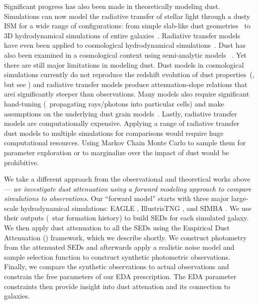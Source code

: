 
Significant progress has also been made in theoretically modeling dust. 
Simulations can now model the radiative transfer of stellar light
through a dusty ISM for a wide range of configurations:
from simple slab-like dust geometries~\citep[\eg][]{witt1996, witt2000,
seon2016} to 3D hydrodynamical simulations of entire
galaxies~\citep[\eg][]{jonsson2006, rocha2008, hayward2015, natale2015,
hou2017}. 
Radiative transfer models have even been applied to cosmological
hydrodynamical simulations~\cite[\eg][]{camps2015, narayanan2018,
cochrane2019, rodriguez-gomez2019, trayford2020}. 
Dust has also been examined in a cosmological context using 
semi-analytic models ~\citep[SAMs; \eg][]{granato2000, fontanot2009, wilkins2012,
gonzalez-perez2013, popping2017}. 
Yet there are still major limitations in modeling dust. 
Dust models in cosmological simulations currently do not reproduce the
redshift evolution of dust properties~(\citealp{somerville2012, yung2019,
vogelsberger2020}, but see \citealp{li2019}) and radiative transfer models
produce attenuation-slope relations that arei significantly steeper than observations. 
Many models also require significant hand-tuning (\eg~propagating rays/photons into
particular cells) and make assumptions on the underlying dust grain models~\citep[see][for a review]{steinacker2013}. 
Lastly, radiative transfer models are computationally expensive.  
Applying a range of radiative transfer dust models to multiple simulations for
comparisons would require huge computational resources.
Using Markov Chain Monte Carlo to sample them for parameter exploration or
to marginalize over the impact of dust would be prohibitive.  

We take a different approach from the observational and theoretical works
above --- \emph{we investigate dust attenuation using a forward modeling
approach to compare simulations to observations}.
Our ``forward model'' starts with three major large-scale hydrodynamical
simulations: EAGLE \citep{schaye2015}, IllustrisTNG \citep{nelson2019},
and SIMBA \citep{dave2019}. 
We use their outputs (\eg~star formation history) to build SEDs for each
simulated galaxy.
We then apply dust attenuation to all the SEDs using the Empirical Dust
Attenuation (\eda) framework, which we describe shortly.
We construct photometry from the attenuated SEDs and afterwards apply a 
realistic noise model and sample selection function to construct synthetic
photometric observations. 
Finally, we compare the synthetic observations to actual observations and
constrain the free parameters of our EDA prescription. 
The EDA parameter constraints then provide insight into dust attenation and its
connection to galaxies.

